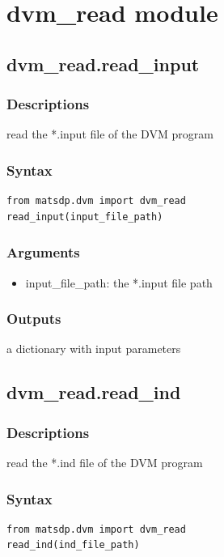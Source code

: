 \documentclass[12pt]{book}
\begin{document}
\section{dvm\_read module}

\subsection{dvm\_read.read\_input}

\subsubsection{Descriptions}
read the *.input file of the DVM program
\subsubsection{Syntax}
\begin{lstlisting}
from matsdp.dvm import dvm_read
read_input(input_file_path)
\end{lstlisting}

\subsubsection{Arguments}
\begin{itemize}
\item input\_file\_path: the *.input file path
\end{itemize}

\subsubsection{Outputs}
a dictionary with input parameters

\subsection{dvm\_read.read\_ind}

\subsubsection{Descriptions}
read the *.ind file of the DVM program
\subsubsection{Syntax}
\begin{lstlisting}
from matsdp.dvm import dvm_read
read_ind(ind_file_path)
\end{lstlisting}
\end{document}
